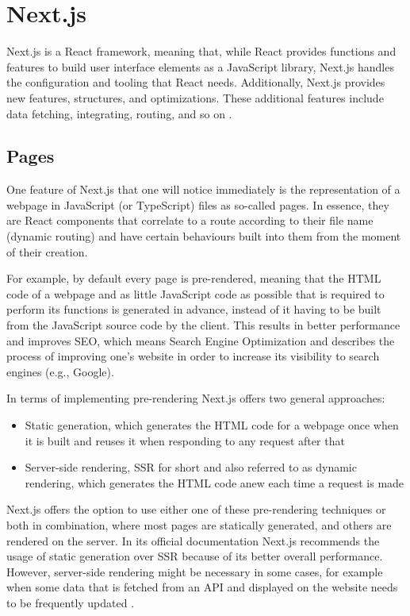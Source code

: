 \section{Next.js}
Next.js is a React framework, meaning that, while React provides functions and features to build user interface elements
as a JavaScript library, Next.js handles the configuration and tooling that React needs. Additionally, Next.js provides
new features, structures, and optimizations. These additional features include data fetching, integrating, routing,
and so on \cite{NextjsDescription}.

\subsection{Pages}
One feature of Next.js that one will notice immediately is the representation of a webpage in JavaScript (or TypeScript) files as
so-called pages. In essence, they are React components that correlate to a route according to their file name (dynamic routing) and
have certain behaviours built into them from the moment of their creation.

For example, by default every page is pre-rendered, meaning that the HTML code of a webpage and as little JavaScript code as possible
that is required to perform its functions is generated in advance, instead of it having to be built from the JavaScript source code by
the client. This results in better performance and improves SEO, which means Search Engine Optimization and describes the process
of improving one's website in order to increase its visibility to search engines (e.g., Google).

In terms of implementing pre-rendering Next.js offers two general approaches: 
\begin{itemize}
  \item Static generation, which generates the HTML code for a webpage once when it is built and reuses it when responding to any request after that
  \item Server-side rendering, SSR for short and also referred to as dynamic rendering, which generates the HTML code anew each time a request is made
\end{itemize}

Next.js offers the option to use either one of these pre-rendering
techniques or both in combination, where most pages are statically generated, and others are rendered on the server. In its official
documentation Next.js recommends the usage of static generation over SSR because of its better overall performance. However, server-side
rendering might be necessary in some cases, for example when some data that is fetched from an API and displayed on the website needs
to be frequently updated \cite{NextjsPages}.

